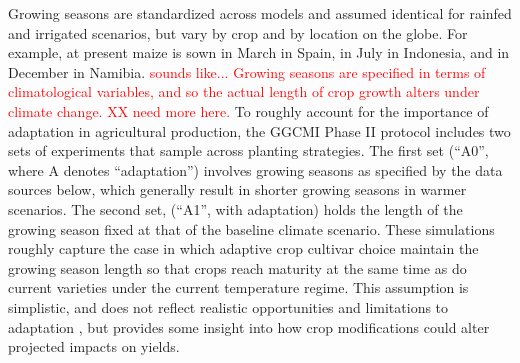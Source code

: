 \documentclass[gmd, manuscript]{copernicus} %
\begin{document}
{Growing seasons are standardized across models and assumed identical for rainfed and irrigated scenarios, but vary by crop and by location on the globe. 
For example, at present maize is sown in March in Spain, in July in Indonesia, and in December in Namibia. 
\textcolor{red}{sounds like... Growing seasons are specified in terms of climatological variables, and so the actual length of crop growth alters under climate change. XX need more here.} To roughly account for the importance of adaptation in agricultural production, the GGCMI Phase II protocol includes two sets of experiments that sample across planting strategies. The first set (``A0'', where A denotes ``adaptation'') involves growing seasons as specified by the data sources below, which generally result in shorter growing seasons in warmer scenarios. The second set, (``A1'', with adaptation) holds the length of the growing season fixed at that of the baseline climate scenario. These simulations roughly capture the case in which adaptive crop cultivar choice maintain the growing season length so that crops reach maturity at the same time as do current varieties under the current temperature regime. This assumption is simplistic, and does not reflect realistic opportunities and limitations to adaptation \citep{vadez2012adaptation,challinor2018improving}, but provides some insight into how crop modifications could alter projected impacts on yields.

}
\end{document}
